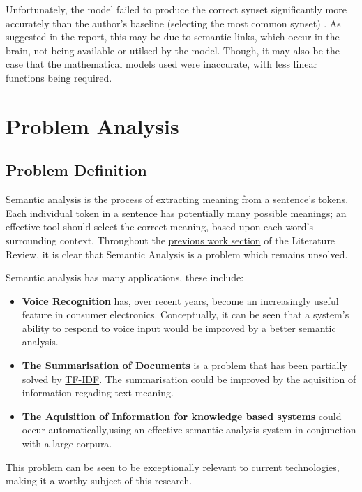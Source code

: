 \documentclass[]{article}
\begin{document}
Unfortunately, the model failed to produce the correct synset significantly more accurately than the author's baseline (selecting the most common synset) \cite{MattBurkePrevious}. As suggested in the report, this may be due to semantic links, which occur in the brain, not being available or utilsed by the model. Though, it may also be the case that the mathematical models used were inaccurate, with less linear functions being required.








\section{Problem Analysis}
\label{sec:ProbAnalysis}

\subsection{Problem Definition}
\label{sec:ProbDef}
Semantic analysis is the process of extracting meaning from a sentence's tokens. Each individual token in a sentence has potentially many possible meanings; an effective tool should select the correct meaning, based upon each word's surrounding context. Throughout the \hyperref[sec:PrevWork]{previous work section} of the Literature Review, it is clear that Semantic Analysis is a problem which remains unsolved. 

Semantic analysis has many applications, these include:
\begin{itemize}
	\item \textbf{Voice Recognition} has, over recent years, become an increasingly useful feature in consumer electronics. Conceptually, it can be seen that a system's ability to respond to voice input would be improved by a better semantic analysis.
	
	\item \textbf{The Summarisation of Documents} is a problem that has been partially solved by \hyperref[sec:TFIDF]{TF-IDF}. The summarisation could be improved by the aquisition of information regading text meaning.
	 
	\item \textbf{The Aquisition of Information for knowledge based systems} could occur automatically,using an effective semantic analysis system in conjunction with a large corpura.
\end{itemize}
This problem can be seen to be exceptionally relevant to current technologies, making it a worthy subject of this research.
\end{document}
